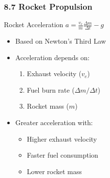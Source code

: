 \documentclass{beamer}
\begin{document}
\begin{frame}
\frametitle{8.7 Rocket Propulsion}

\begin{block}{Rocket Acceleration}
$a = \frac{v_e}{m}\frac{\Delta m}{\Delta t} - g$
\end{block}

\begin{itemize}
\item Based on Newton's Third Law
\item Acceleration depends on:
    \begin{enumerate}
    \item Exhaust velocity ($v_e$)
    \item Fuel burn rate ($\Delta m/\Delta t$)
    \item Rocket mass ($m$)
    \end{enumerate}
\item Greater acceleration with:
    \begin{itemize}
    \item Higher exhaust velocity
    \item Faster fuel consumption
    \item Lower rocket mass
    \end{itemize}
\end{itemize}
\end{frame}

\iffalse
\begin{comment}
    

\begin{frame}
\frametitle{Example: Elastic Collision}
\framesubtitle{I Do}
A 2.0 kg ball moving at 3.0 m/s collides elastically with a 1.0 kg ball at rest.
\begin{enumerate}
\item Conservation of momentum:
    \[ (2.0)(3.0) = 2.0v_1 + 1.0v_2 \]
\item Conservation of energy:
    \[ \frac{1}{2}(2.0)(3.0)^2 = \frac{1}{2}(2.0)v_1^2 + \frac{1}{2}(1.0)v_2^2 \]
\item Solution:
    \[ v_1 = 1.0 \text{ m/s}, v_2 = 4.0 \text{ m/s} \]
\end{enumerate}
\end{frame}
\end{comment}
\fi
\end{document}
